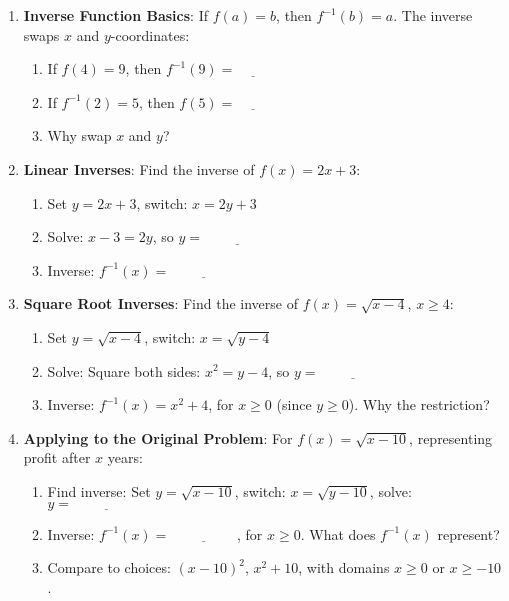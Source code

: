 \documentclass[12pt]{article}
\begin{document}
\begin{enumerate}[label=11.\arabic*]
    \item \textbf{Inverse Function Basics}: If \( f(a) = b \), then \( f^{-1}(b) = a \). The inverse swaps \( x \) and \( y \)-coordinates:
    \begin{enumerate}[label=\alph*)]
        \item If \( f(4) = 9 \), then \( f^{-1}(9) = \underline{\hspace{1cm}} \)
        \item If \( f^{-1}(2) = 5 \), then \( f(5) = \underline{\hspace{1cm}} \)
        \item Why swap \( x \) and \( y \)? \underline{\hspace{6cm}}
    \end{enumerate}
    \item \textbf{Linear Inverses}: Find the inverse of \( f(x) = 2x + 3 \):
    \begin{enumerate}[label=\alph*)]
        \item Set \( y = 2x + 3 \), switch: \( x = 2y + 3 \)
        \item Solve: \( x - 3 = 2y \), so \( y = \underline{\hspace{2cm}} \)
        \item Inverse: \( f^{-1}(x) = \underline{\hspace{2cm}} \)
    \end{enumerate}
    \item \textbf{Square Root Inverses}: Find the inverse of \( f(x) = \sqrt{x - 4} \), \( x \geq 4 \):
    \begin{enumerate}[label=\alph*)]
        \item Set \( y = \sqrt{x - 4} \), switch: \( x = \sqrt{y - 4} \)
        \item Solve: Square both sides: \( x^2 = y - 4 \), so \( y = \underline{\hspace{2cm}} \)
        \item Inverse: \( f^{-1}(x) = x^2 + 4 \), for \( x \geq 0 \) (since \( y \geq 0 \)). Why the restriction? \underline{\hspace{4cm}}
    \end{enumerate}
    \item \textbf{Applying to the Original Problem}: For \( f(x) = \sqrt{x - 10} \), representing profit after \( x \) years:
    \begin{enumerate}[label=\alph*)]
        \item Find inverse: Set \( y = \sqrt{x - 10} \), switch: \( x = \sqrt{y - 10} \), solve: \( y = \underline{\hspace{2cm}} \)
        \item Inverse: \( f^{-1}(x) = \underline{\hspace{2cm}} \), for \( x \geq 0 \). What does \( f^{-1}(x) \) represent? \underline{\hspace{4cm}}
        \item Compare to choices: \( (x - 10)^2 \), \( x^2 + 10 \), with domains \( x \geq 0 \) or \( x \geq -10 \).
    \end{enumerate}
\end{enumerate}
\end{document}
